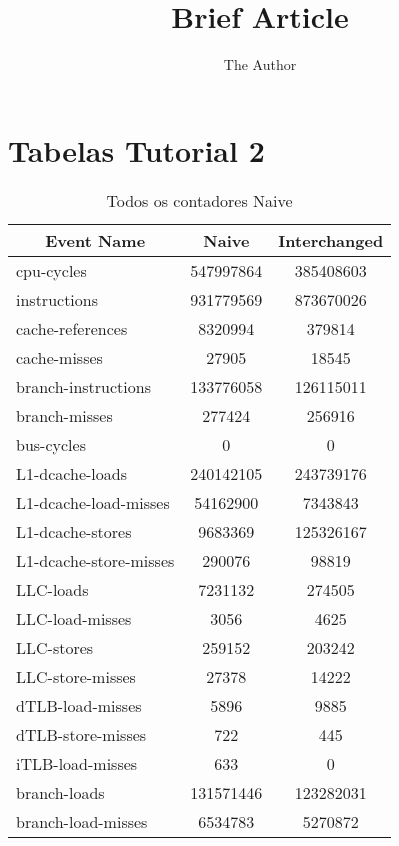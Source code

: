 \documentclass[11pt, oneside]{article}   	%
\title{Brief Article}
\author{The Author}
\begin{document}
\section{Tabelas Tutorial 2}


\begin{table}[h!]
\centering
\label{my-label}
\begin{tabular}{|l|c|c|}
\hline
\multicolumn{1}{|c|}{\textbf{Event Name}} & \textbf{Naive} & \textbf{Interchanged} \\ \hline
cpu-cycles                                & 547997864      & 385408603             \\ \hline
instructions                              & 931779569      & 873670026             \\ \hline
cache-references                          & 8320994        & 379814                \\ \hline
cache-misses                              & 27905          & 18545                 \\ \hline
branch-instructions                       & 133776058      & 126115011             \\ \hline
branch-misses                             & 277424         & 256916                \\ \hline
bus-cycles                                & 0              & 0                     \\ \hline
L1-dcache-loads                           & 240142105      & 243739176             \\ \hline
L1-dcache-load-misses                     & 54162900       & 7343843               \\ \hline
L1-dcache-stores                          & 9683369        & 125326167             \\ \hline
L1-dcache-store-misses                    & 290076         & 98819                 \\ \hline
LLC-loads                                 & 7231132        & 274505                \\ \hline
LLC-load-misses                           & 3056           & 4625                  \\ \hline
LLC-stores                                & 259152         & 203242                \\ \hline
LLC-store-misses                          & 27378          & 14222                 \\ \hline
dTLB-load-misses                          & 5896           & 9885                  \\ \hline
dTLB-store-misses                         & 722            & 445                   \\ \hline
iTLB-load-misses                          & 633            & 0                     \\ \hline
branch-loads                              & 131571446      & 123282031             \\ \hline
branch-load-misses                        & 6534783        & 5270872               \\ \hline
\end{tabular}
\caption{Todos os contadores Naive}
\end{table}
\end{document}
